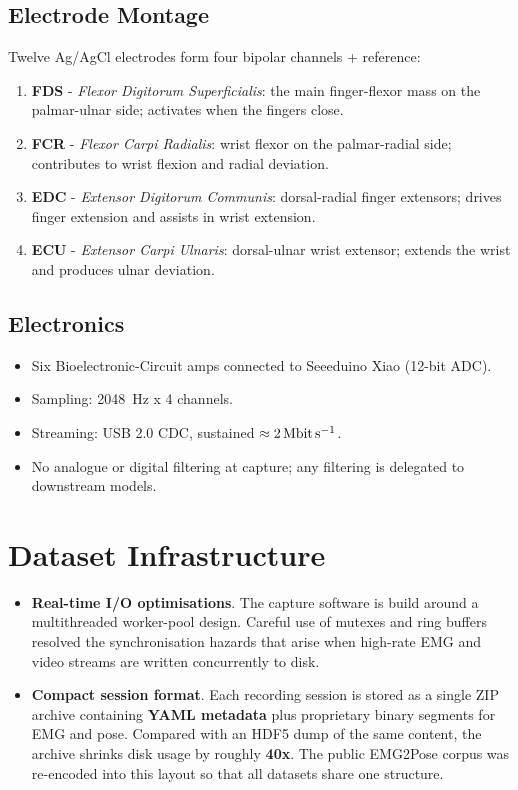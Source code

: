 \subsection{Electrode Montage}
Twelve Ag/AgCl electrodes form four bipolar channels + reference:

\begin{enumerate}[label=\alph*]
  \item \textbf{FDS} - \emph{Flexor Digitorum Superficialis}: the main finger-flexor mass on the palmar-ulnar side; activates when the fingers close.
  \item \textbf{FCR} - \emph{Flexor Carpi Radialis}: wrist flexor on the palmar-radial side; contributes to wrist flexion and radial deviation.
  \item \textbf{EDC} - \emph{Extensor Digitorum Communis}: dorsal-radial finger extensors; drives finger extension and assists in wrist extension.
  \item \textbf{ECU} - \emph{Extensor Carpi Ulnaris}: dorsal-ulnar wrist extensor; extends the wrist and produces ulnar deviation.
\end{enumerate}

\subsection{Electronics}
\begin{itemize}
  \item Six Bioelectronic-Circuit amps connected to Seeeduino Xiao (12-bit ADC).
  \item Sampling: \SI{2048}{Hz} x 4 channels.
  \item Streaming: USB 2.0 CDC, sustained $\approx \SI{2}{\mega\bit\per\second}$.
  \item No analogue or digital filtering at capture; any filtering is delegated
        to downstream models.
\end{itemize}

\section{Dataset Infrastructure}
\begin{itemize}
    \item \textbf{Real-time I/O optimisations}.
          The capture software is build around a multithreaded
          worker-pool design. Careful use of mutexes and ring buffers resolved
          the synchronisation hazards that arise when high-rate EMG and video
          streams are written concurrently to disk.
    \item \textbf{Compact session format}.
          Each recording session is stored as a single ZIP archive containing
          \textbf{YAML metadata} plus proprietary binary segments for EMG and
          pose. Compared with an HDF5 dump of the same content, the archive
          shrinks disk usage by roughly \textbf{40x}. The public EMG2Pose
          corpus was re-encoded into this layout so that all datasets share one
          structure.
\end{itemize}

